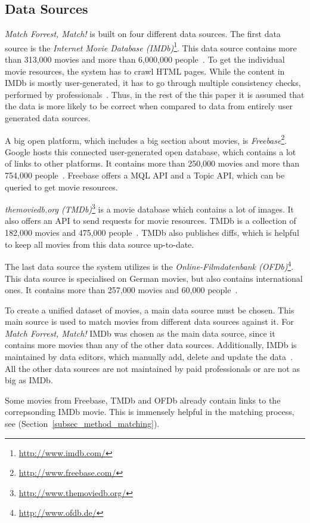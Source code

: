 \subsection{Data Sources}
\label{subsec_method_datasources}

\emph{Match Forrest, Match!} is built on four different data sources.
The first data source is the \textit{Internet Movie Database (IMDb)}\footnote{\url{http://www.imdb.com/}}.
This data source contains more than 313,000 movies and more than 6,000,000 people~\cite{IMDb_stats}.
To get the individual movie resources, the system has to crawl HTML pages.
While the content in IMDb is mostly user-generated, it has to go through multiple consistency checks, performed by professionals~\cite{IMDb_DataCreation, IMDb_amazon}.
Thus, in the rest of the this paper it is assumed that the data is more likely to be correct when compared to data from entirely user generated data sources.

A big open platform, which includes a big section about movies, is \textit{Freebase}\footnote{\url{http://www.freebase.com/}}.
Google hosts this connected user-generated open database, which contains a lot of links to other platforms.
It contains more than 250,000 movies and more than 754,000 people~\cite{Freebase_stats}.
Freebase offers a MQL API and a Topic API, which can be queried to get movie resources.

\textit{themoviedb.org (TMDb)}\footnote{\url{http://www.themoviedb.org/}} is a movie database which contains a lot of images.
It also offers an API to send requests for movie resources.
TMDb is a collection of 182,000 movies and 475,000 people~\cite{TMDb_stats}.
TMDb also publishes diffs, which is helpful to keep all movies from this data source up-to-date.

The last data source the system utilizes is the \textit{Online-Filmdatenbank (OFDb)}\footnote{\url{http://www.ofdb.de/}}.
This data source is specialised on German movies, but also contains international ones.
It contains more than 257,000 movies and 60,000 people~\cite{OFDb_stats}.

To create a unified dataset of movies, a main data source must be chosen.
This main source is used to match movies from different data sources against it.
For \emph{Match Forrest, Match!} IMDb was chosen as the main data source, since it contains more movies than any of the other data sources.
Additionally, IMDb is maintained by data editors, which manually add, delete and update the data~\cite{IMDb_DataCreation, IMDb_amazon}.
All the other data sources are not maintained by paid professionals or are not as big as IMDb.

Some movies from Freebase, TMDb and OFDb already contain links to the correpsonding IMDb movie.
This is immensely helpful in the matching process, see (Section~\ref{subsec_method_matching}).